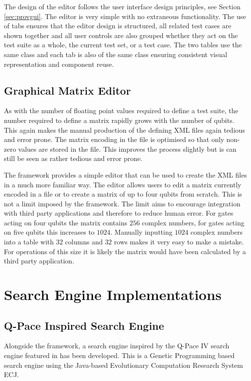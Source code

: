 The design of the editor follows the user interface design principles, see Section \ref{sec:provgui}.
The editor is very simple with no extraneous functionality.
The use of tabs ensures that the editor design is structured, all related test cases are shown together and all user controls are also grouped whether they act on the test suite as a whole, the current test set, or a test case.
The two tables use the same class and each tab is also of the same class ensuring consistent visual representation and component reuse.

\subsection{Graphical Matrix Editor}
\label{sec:indmatrixeditor}
As with the number of floating point values required to define a test suite, the number required to define a matrix rapidly grows with the number of qubits.
This again makes the manual production of the defining XML files again tedious and error prone.
The matrix encoding in the file is optimised so that only non-zero values are stored in the file.
This improves the process slightly but is can still be seen as rather tedious and error prone.

The framework provides a simple editor that can be used to create the XML files in a much more familiar way.
The editor allows users to edit a matrix currently encoded in a file or to create a matrix of up to four qubits from scratch.
This is not a limit imposed by the framework.
The limit aims to encourage integration with third party applications and therefore to reduce human error.
For gates acting on four qubits the matrix contains $256$ complex numbers, for gates acting on five qubits this increases to $1024$.
Manually inputting $1024$ complex numbers into a table with $32$ columns and $32$ rows makes it very easy to make a mistake.
For operations of this size it is likely the matrix would have been calculated by a third party application.

\section{Search Engine Implementations}
\label{sec:provsearcheng}
\subsection{Q-Pace Inspired Search Engine}
Alongside the framework, a search engine inspired by the Q-Pace IV search engine featured in \cite{masseythesis} has been developed.
This is a Genetic Programming based search engine using the Java-based Evolutionary Computation Research System ECJ\cite{ecjtool}.

